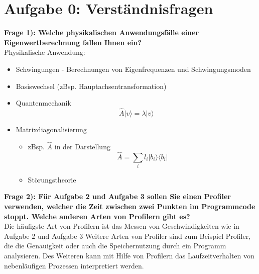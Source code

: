 \section*{Aufgabe 0: Verständnisfragen}

\textbf{Frage 1): Welche physikalischen Anwendungsfälle einer Eigenwertberechnung fallen Ihnen ein?}\\

Physikalische Anwendung:

\begin{itemize}
  \item Schwingungen - Berechnungen von Eigenfrequenzen und Schwingungsmoden
  \item Basiswechsel (zBsp. Hauptachsentransformation)
  \item Quantenmechanik
      \begin{equation*}
        \hat A |v\rangle=\lambda|v\rangle
      \end{equation*}
  \item Matrixdiagonalisierung
  \begin{itemize}
    \item zBsp. $\hat A$ in der Darstellung
    \begin{equation*}
      \hat A = \sum_{i} l_i |b_i\rangle \langle b_i |
    \end{equation*}
    \item Störungstheorie
  \end{itemize}
\end{itemize}

\textbf{Frage 2): Für Aufgabe 2 und Aufgabe 3 sollen Sie einen Profiler verwenden, welcher die Zeit zwischen zwei Punkten im Programmcode stoppt. Welche anderen Arten von Profilern gibt es?}\\


Die häufigste Art von Profilern ist das Messen von Geschwindigkeiten wie in Aufgabe 2 und Aufgabe 3
Weitere Arten von Profiler sind zum Beispiel Profiler, die die Genauigkeit oder auch die Speichernutzung durch ein Programm analysieren.
Des Weiteren kann mit Hilfe von Profilern das Laufzeitverhalten von nebenläufigen Prozessen interpretiert werden.
